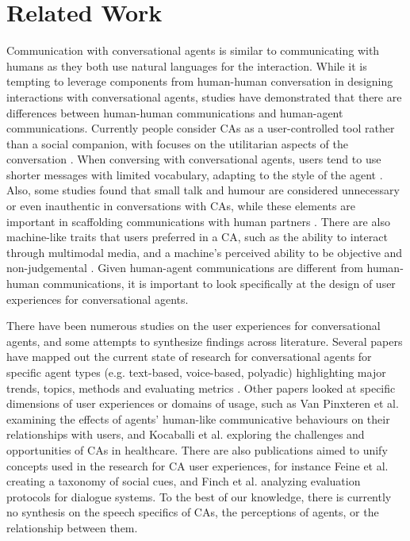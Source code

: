 
\section{Related Work}

Communication with conversational agents is similar to communicating with humans as they both use natural languages for the interaction. While it is tempting to leverage components from human-human conversation in designing interactions with conversational agents, studies have demonstrated that there are differences between human-human communications and human-agent communications. Currently people consider CAs as a user-controlled tool rather than a social companion, with focuses on the utilitarian aspects of the conversation \cite{clark2019makes}\cmt{[1]}. When conversing with conversational agents, users tend to use shorter messages with limited vocabulary, adapting to the style of the agent \cite{hill2015real}. Also, some studies found that small talk and humour are considered unnecessary or even inauthentic in conversations with CAs, while these elements are important in scaffolding communications with human partners \cite{clark2019makes, doyle2019mapping}\cmt{[1],[2]}. There are also machine-like traits that users preferred in a CA, such as the ability to interact through multimodal media, and a machine's perceived ability to be objective and non-judgemental \cite{doyle2019mapping, kim2022understanding}\cmt{[2],[3]}. Given human-agent communications are different from human-human communications, it is important to look specifically at the design of user experiences for conversational agents.

There have been numerous studies on the user experiences for conversational agents, and some attempts to synthesize findings across literature. Several papers have mapped out the current state of research for conversational agents for specific agent types (e.g. text-based, voice-based, polyadic) highlighting major trends, topics, methods and evaluating metrics \cite{clark2019state, rapp2021human, zheng2022ux}\cmt{[33][5]}. Other papers looked at specific dimensions of user experiences or domains of usage, such as Van Pinxteren et al. \cite{van2020human} examining the effects of agents' human-like communicative behaviours on their relationships with users, and Kocaballi et al. \cite{kocaballi2022design} exploring the challenges and opportunities of CAs in healthcare. There are also publications aimed to unify concepts used in the research for CA user experiences, for instance Feine et al. \cite{feine2019taxonomy} creating a taxonomy of social cues, and Finch et al. \cite{finch2020towards} analyzing evaluation protocols for dialogue systems. To the best of our knowledge, there is currently no synthesis on the speech specifics of CAs, the perceptions of agents, or the relationship between them.

